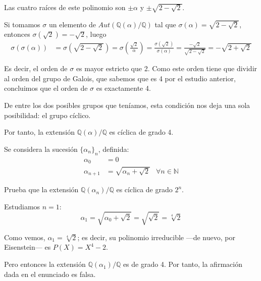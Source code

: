 \documentclass[a4paper, 11pt]{article}
\begin{document}
\begin{solucion}
      Las cuatro raíces de este polinomio son $\pm\alpha$ y $\pm\sqrt{2-\sqrt{2}}$.

      Si tomamos $\sigma$ un elemento de $Aut(\mathbb{Q}(\alpha)/\mathbb{Q})$ tal que $\sigma(\alpha) = \sqrt{2-\sqrt{2}}$, entonces $\sigma(\sqrt{2}) = -\sqrt{2}$, luego
      \begin{align*}
          \sigma(\sigma(\alpha)) &= \sigma(\sqrt{2-\sqrt{2}}) = \sigma\left(\frac{\sqrt{2}}{\alpha}\right) = \frac{\sigma(\sqrt{2})}{\sigma(\alpha)} = \frac{-\sqrt{2}}{\sqrt{2-\sqrt{2}}} = -\sqrt{2+\sqrt{2}}
      \end{align*}

      Es decir, el orden de $\sigma$ es mayor estricto que 2. Como este orden tiene que dividir al orden del grupo de Galois, que sabemos que es 4 por el estudio anterior, concluimos que el orden de $\sigma$ es exactamente 4.

      De entre los dos posibles grupos que teníamos, esta condición nos deja una sola posibilidad: el grupo cíclico.

      Por tanto, la extensión $\mathbb{Q}(\alpha)/\mathbb{Q}$ es cíclica de grado 4.

  \end{solucion}

  \begin{ejercicio}
      Se considera la sucesión $\{\alpha_n\}_n$, definida:
      \begin{align*}
          \alpha_0 &= 0 \\
          \alpha_{n+1} &=  \sqrt{\alpha_n+\sqrt{2}} &\forall n\in\mathbb{N}
      \end{align*}

      Prueba que la extensión $\mathbb{Q}(\alpha_n)/\mathbb{Q}$ es cíclica de grado $2^n$.
  \end{ejercicio}

  \begin{solucion}
      Estudiamos $n = 1$:
      \[
      \alpha_1 = \sqrt{\alpha_0+\sqrt{2}} = \sqrt{\sqrt{2}} = \sqrt[4]{2}
      \]

      Como vemos, $\alpha_1 = \sqrt[4]{2}$; es decir, su polinomio irreducible ---de nuevo, por Eisenstein--- es $P(X) = X^4-2$.

      Pero entonces la extensión $\mathbb{Q}(\alpha_1)/\mathbb{Q}$ es de grado 4. Por tanto, la afirmación dada en el enunciado es falsa.
  \end{solucion}
\end{document}
